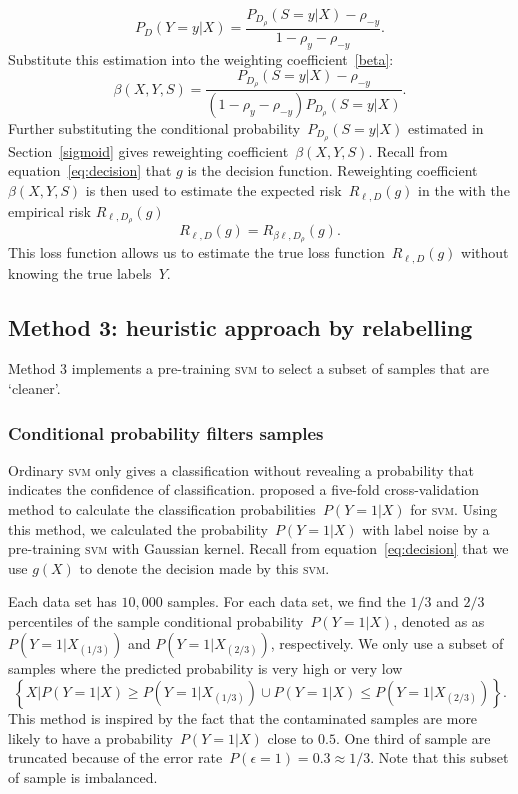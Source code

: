\documentclass[12pt]{article} %
\newcommand{\svm}{\textsc{svm}}
\newcommand{\loss}{\ell}
\begin{document}
\begin{equation}
    P_D(Y=y|X)=\frac{P_{D_\rho}(S=y|X)-\rho_{-y}}{1-\rho_{y}-\rho_{-y}}.
\end{equation}
Substitute this estimation into the weighting coefficient~\eqref{beta}:
\begin{equation} \label{eq:weighting}
    \beta(X,Y,S)=\frac{P_{D_\rho}(S=y|X)-\rho_{-y}}{(1-\rho_{y}-\rho_{-y})P_{D_\rho}(S=y|X)}.
\end{equation}
Further substituting the conditional probability~$P_{D_\rho}(S=y|X)$ estimated in Section~\ref{sigmoid} gives reweighting coefficient~$\beta(X,Y,S)$.
Recall from equation~\eqref{eq:decision} that  $g$ is the decision function.
Reweighting coefficient~$\beta(X,Y,S)$ is then used to estimate the expected risk~$R_{\loss,D}(g)$ in the with the empirical risk $R_{\loss,D_\rho}(g)$
\begin{equation}
R_{\loss,D}(g) = R_{\beta \loss,D_\rho}(g). \label{eq:loss}
\end{equation}
This loss function allows us to estimate the true loss function~$R_{\loss,D}(g)$ without knowing the true labels~$Y$.

\subsection{Method 3: heuristic approach by relabelling}\label{2nd}
Method 3 implements a pre-training \textsc{svm} to select a subset of samples that are `cleaner'.

\subsubsection{Conditional probability filters samples}\label{2nd2}
Ordinary \textsc{svm} only gives a classification without revealing a probability that indicates the confidence of classification.
\citet{Wu03probabilityestimates} proposed a five-fold cross-validation method to calculate the classification probabilities~$P(Y=1|X)$ for \textsc{svm}.
Using this method, we calculated the probability~$P(Y=1|X)$ with label noise by a pre-training \textsc{svm} with Gaussian kernel. Recall from equation~\eqref{eq:decision} that we use $g(X)$ to denote the decision made by this \svm .

Each data set has $10,000$ samples.
For each data set, we find the $1/3$ and $2/3$ percentiles of the sample conditional probability~$P(Y=1|X)$, denoted as as $P(Y=1|X_{(1/3)})$ and $P(Y=1|X_{(2/3)})$, respectively.
We only use a subset of samples where the predicted probability is very high or very low
\begin{equation}\label{eq:filter}
\left\{X|P(Y=1|X)\geq P(Y=1|X_{(1/3)}) \cup P(Y=1|X)\leq P(Y=1|X_{(2/3)}) \right\}.
\end{equation}
This method is inspired by the fact that the contaminated samples are more likely to have a probability~$P(Y=1|X)$ close to $0.5$. One third of sample are truncated because of the error rate~$P(\epsilon=1)=0.3\approx 1/3$. Note that this subset of sample is imbalanced.
\end{document}
